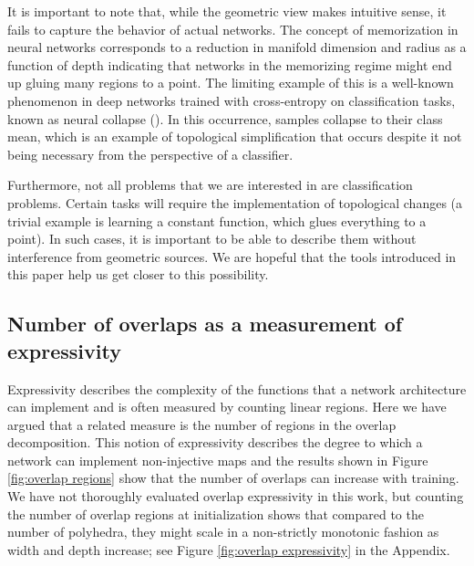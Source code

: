 \documentclass[10pt]{article} %
\theoremstyle{plain}
\theoremstyle{definition}
\theoremstyle{remark}
\begin{document}
It is important to note that, while the geometric view makes intuitive sense, it fails to capture the behavior of actual networks. {The concept of memorization in neural networks corresponds to a reduction in manifold dimension and radius as a function of depth \cite{stephenson2021geometry} indicating that networks in the memorizing regime might end up gluing many regions to a point. The limiting example of this is} a well-known phenomenon in deep networks trained with cross-entropy on classification tasks, known as neural collapse (\cite{papyan2020prevalence, rangamani2023feature}). In this occurrence, samples collapse to their class mean, which is an example of topological simplification that occurs despite it not being necessary from the perspective of a classifier. 

Furthermore, not all problems that we are interested in are classification problems. Certain tasks will require the implementation of topological changes (a trivial example is learning a constant function, which glues everything to a point). In such cases, it is important to be able to describe them without interference from geometric sources. We are hopeful that the tools introduced in this paper help us get closer to this possibility.


\subsection{Number of overlaps as a measurement of expressivity}
\label{top express}

Expressivity describes the complexity of the functions that a network architecture can implement and is often measured by counting linear regions. Here we have argued that a related measure is the number of regions in the overlap decomposition. This notion of expressivity describes the degree to which a network can implement non-injective maps {and the results shown in Figure \ref{fig:overlap regions} show that the number of overlaps can increase with training}. We have not thoroughly evaluated overlap expressivity in this work, but counting the number of overlap regions at initialization shows that compared to the number of polyhedra, they might scale in a non-strictly monotonic fashion as width and depth increase; see Figure \ref{fig:overlap expressivity} in the Appendix.
\end{document}
